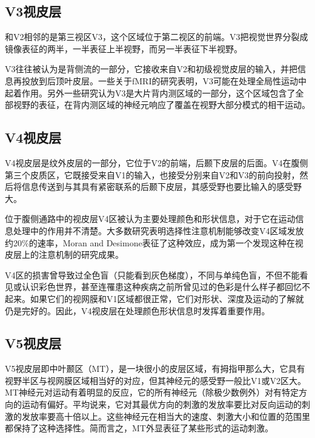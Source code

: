 \documentclass[a4paper,12pt]{article}
\begin{document}
\subsection{V3视皮层}


和V2相邻的是第三视区V3\cite{9:article}，这个区域位于第二视区的前端。V3把视觉世界分裂成镜像表征的两半，一半表征上半视野，而另一半表征下半视野。
        

V3往往被认为是背侧流的一部分，它接收来自V2和初级视觉皮层的输入，并把信息再投放到后顶叶皮层。一些关于fMRI的研究表明，V3可能在处理全局性运动\cite{10:article}中起着作用。另外一些研究认为V3是大片背内测区域的一部分，这个区域包含了全部视野的表征，在背内测区域的神经元响应了覆盖在视野大部分模式的相干运动。


\subsection{V4视皮层}


V4视皮层是纹外皮层的一部分，它位于V2的前端，后颞下皮层的后面。V4在腹侧第三个皮质区\cite{5:article}，它既接受来自V1的输入，也接受分别来自V2和V3的前向投射，然后将信息传送到与其具有紧密联系的后颞下皮层，其感受野也要比输入的感受野大。
        

位于腹侧通路中的视皮层V4区被认为主要处理颜色和形状信息，对于它在运动信息处理中的作用并不清楚\cite{15:book}。大多数研究表明选择性注意机制能够改变V4区域发放约20\%的速率，Moran and Desimone表征了这种效应，成为第一个发现这种在视皮层上的注意机制的研究成果。
        

V4区的损害\cite{12:book}曾导致过全色盲（只能看到灰色梯度），不同与单纯色盲，不但不能看见或认识彩色世界，甚至连罹患这种疾病之前所曾见过的色彩是什么样子都回忆不起来。如果它们的视网膜和V1区域都很正常，它们对形状、深度及运动的了解就仍是完好的。因此，V4视皮层在处理颜色形状信息时发挥着重要作用。


\subsection{V5视皮层}



V5视皮层即中叶颞区（MT）\cite{7:article}，是一块很小的皮层区域，有拇指甲那么大，它具有视野半区与视网膜区域相当好的对应，但其神经元的感受野一般比V1或V2区大。MT神经元对运动有着明显的反应，它的所有神经元（除极少数例外）对有特定方向的运动有偏好。平均说来，它对其最优方向的刺激的发放率要比对反向运动的刺激的发放率要高十倍以上。这些神经元在相当大的速度、刺激大小和位置的范围里都保持了这种选择性。简而言之，MT外显表征了某些形式的运动刺激。
       
\end{document}
